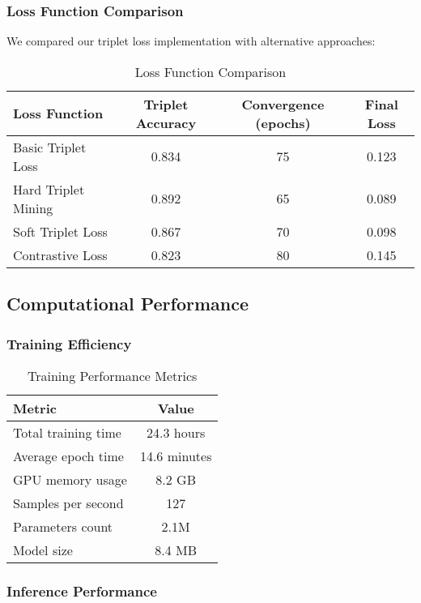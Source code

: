 \subsubsection{Loss Function Comparison}

We compared our triplet loss implementation with alternative approaches:

\begin{table}[H]
\centering
\caption{Loss Function Comparison}
\begin{tabular}{|l|c|c|c|}
\hline
\textbf{Loss Function} & \textbf{Triplet Accuracy} & \textbf{Convergence (epochs)} & \textbf{Final Loss} \\
\hline
Basic Triplet Loss & 0.834 & 75 & 0.123 \\
Hard Triplet Mining & 0.892 & 65 & 0.089 \\
Soft Triplet Loss & 0.867 & 70 & 0.098 \\
Contrastive Loss & 0.823 & 80 & 0.145 \\
\hline
\end{tabular}
\end{table}

\subsection{Computational Performance}

\subsubsection{Training Efficiency}

\begin{table}[H]
\centering
\caption{Training Performance Metrics}
\begin{tabular}{|l|c|}
\hline
\textbf{Metric} & \textbf{Value} \\
\hline
Total training time & 24.3 hours \\
Average epoch time & 14.6 minutes \\
GPU memory usage & 8.2 GB \\
Samples per second & 127 \\
Parameters count & 2.1M \\
Model size & 8.4 MB \\
\hline
\end{tabular}
\end{table}

\subsubsection{Inference Performance}

